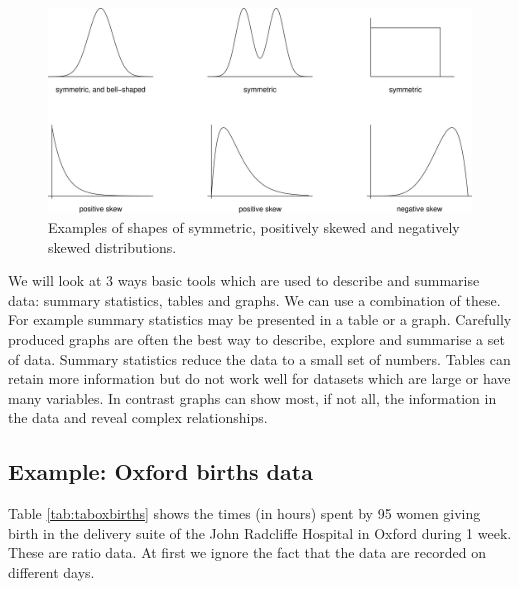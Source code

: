 \documentclass[
  british,
]{book}
\begin{document}
\begin{figure}

{\centering \includegraphics[width=0.8\linewidth]{images/shapes} 

}

\caption{Examples of shapes of symmetric, positively skewed and negatively skewed distributions.}\label{fig:shapes}
\end{figure}
\FloatBarrier

We will look at 3 ways basic tools which are used to describe and summarise data: summary statistics, tables and graphs. We can use a combination of these. For example summary statistics may be presented in a table or a graph. Carefully produced graphs are often the best way to describe, explore and summarise a set of data. Summary statistics reduce the data to a small set of numbers. Tables can retain more information but do not work well for datasets which are large or have many variables. In contrast graphs can show most, if not all, the information in the data and reveal complex relationships.

\hypertarget{example-oxford-births-data}{%
\subsection*{Example: Oxford births data}\label{example-oxford-births-data}}

Table \ref{tab:taboxbirths} shows the times (in hours) spent by 95 women giving birth in the delivery suite of the John Radcliffe Hospital in Oxford during 1 week. These are ratio data. At first we ignore the fact that the data are recorded on different days.
\end{document}
